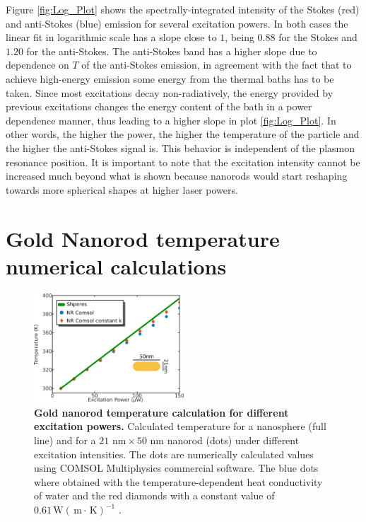 \documentclass[journal=nalefd,manuscript=letter]{achemso}
\newcommand{\K}{\ensuremath{\,\textrm{K}}}
\newcommand{\nm}{\ensuremath{\,\textrm{nm}}}
\newcommand{\m}{\ensuremath{\,\textrm{m}}}
\newcommand{\W}{\ensuremath{\,\textrm{W}}}
\begin{document}
Figure \ref{fig:Log_Plot} shows the spectrally-integrated intensity of the Stokes (red) and
anti-Stokes (blue) emission for several excitation powers. In both cases the
linear fit in logarithmic scale has a slope close to $1$, being $0.88$ for the
Stokes and $1.20$ for the anti-Stokes. 
The anti-Stokes band has a higher slope due to dependence on $T$ of the 
anti-Stokes emission, in agreement with the fact that to achieve high-energy
emission some energy from the thermal baths has to be taken. Since most 
excitations decay non-radiatively, the energy provided by previous excitations
changes the energy content of the bath in a power dependence manner, thus leading
to a higher slope in plot \ref{fig:Log_Plot}. In other words, the higher the power, 
the higher the temperature of the particle and the higher the anti-Stokes signal is. 
This behavior is independent of the plasmon resonance position. 
It is important to note that the excitation intensity cannot
be increased much beyond what is shown because nanorods would start reshaping
towards more spherical shapes at higher laser powers.



\pagebreak
\section{Gold Nanorod temperature numerical calculations} \label{sec:temp-calc}

\begin{figure}[htp] \centering
\includegraphics[width=0.5\textwidth]{Figures/Supplementary/04_Compare_Comsol/04_Compare_Comsol.png}
\caption{\textbf{Gold nanorod temperature calculation for different excitation powers.}
Calculated temperature for a nanosphere (full line) and 
for a $21\,\nm\times 50\,\nm$ nanorod (dots) under different excitation intensities. 
The dots are numerically calculated values using COMSOL Multiphysics commercial software. 
The blue dots where obtained with the temperature-dependent heat conductivity of water 
and the red diamonds with a constant value of $0.61 \W(\m\cdot\K)^{-1}$ .}
	\label{fig:Compare-Comsol}
\end{figure}
\end{document}
